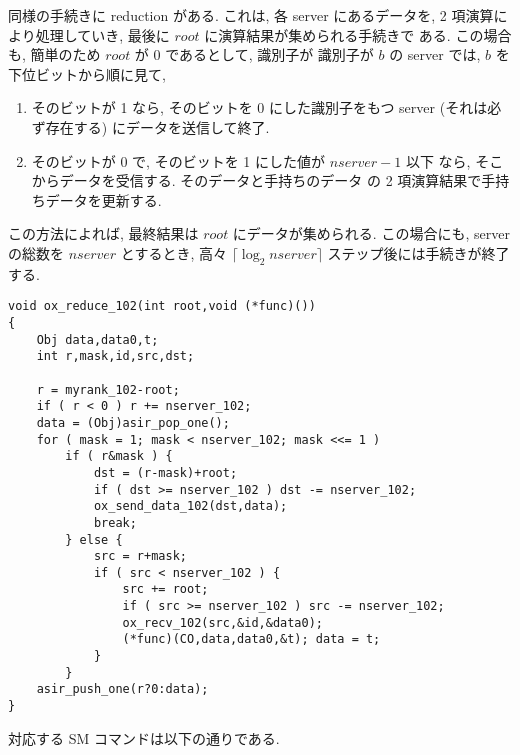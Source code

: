 \documentclass[12pt]{jarticle}
\begin{document}
同様の手続きに reduction がある. これは, 各 server にあるデータを, 2 
項演算により処理していき, 最後に $root$ に演算結果が集められる手続きで
ある.  この場合も, 簡単のため $root$ が $0$ であるとして, 識別子が 
識別子が $b$ の server では, $b$ を下位ビットから順に見て,

\begin{enumerate}
\item そのビットが 1 なら, そのビットを 0 にした識別子をもつ server 
(それは必ず存在する) にデータを送信して終了.
\item そのビットが 0 で, そのビットを 1 にした値が $nserver-1$ 以下
なら, そこからデータを受信する. そのデータと手持ちのデータ
の 2 項演算結果で手持ちデータを更新する.
\end{enumerate}

この方法によれば, 最終結果は $root$ にデータが集められる. この場合にも,
server の総数を $nserver$ とするとき, 高々 $\lceil \log_2 nserver\rceil$
ステップ後には手続きが終了する.

\begin{verbatim}
void ox_reduce_102(int root,void (*func)())
{
    Obj data,data0,t;
    int r,mask,id,src,dst;

    r = myrank_102-root;
    if ( r < 0 ) r += nserver_102;
    data = (Obj)asir_pop_one();
    for ( mask = 1; mask < nserver_102; mask <<= 1 )
        if ( r&mask ) {
            dst = (r-mask)+root;
            if ( dst >= nserver_102 ) dst -= nserver_102;
            ox_send_data_102(dst,data);
            break;
        } else {
            src = r+mask;
            if ( src < nserver_102 ) {
                src += root;
                if ( src >= nserver_102 ) src -= nserver_102;
                ox_recv_102(src,&id,&data0);
                (*func)(CO,data,data0,&t); data = t;
            }
        }
    asir_push_one(r?0:data);
}
\end{verbatim}

対応する SM コマンドは以下の通りである.
\end{document}
